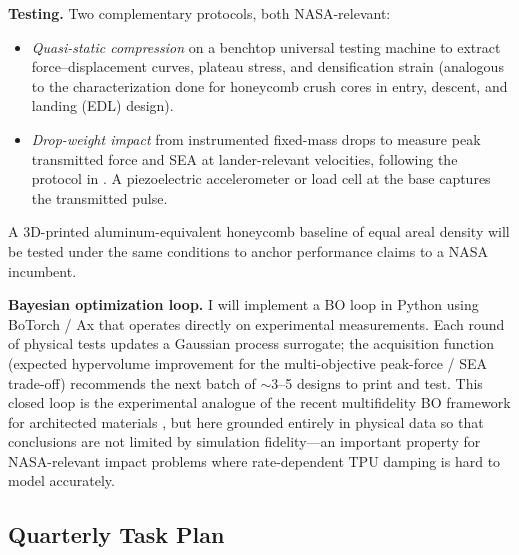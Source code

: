 \documentclass[11pt]{article}
\begin{document}
\textbf{Testing.} Two complementary protocols, both NASA-relevant:
\begin{itemize}[leftmargin=1.5em,itemsep=0.1em]
    \item \emph{Quasi-static compression} on a benchtop universal testing
    machine to extract force--displacement curves, plateau stress, and
    densification strain (analogous to the characterization done for
    honeycomb crush cores in entry, descent, and landing (EDL) design).
    \item \emph{Drop-weight impact} from instrumented fixed-mass drops to
    measure peak transmitted force and SEA at lander-relevant velocities,
    following the protocol in \citep{pajunen2019design}.
    A piezoelectric accelerometer or load cell at the base captures the
    transmitted pulse.
\end{itemize}
A 3D-printed aluminum-equivalent honeycomb baseline of equal areal density
will be tested under the same conditions to anchor performance claims to a
NASA incumbent.

\textbf{Bayesian optimization loop.} I will implement a BO loop in Python
using BoTorch / Ax \citep{balandat2020botorch} that operates directly on
experimental measurements.  Each round of physical tests updates a Gaussian
process surrogate; the acquisition function (expected hypervolume improvement
for the multi-objective peak-force / SEA trade-off) recommends the next batch
of $\sim$3--5 designs to print and test.  This closed loop is the experimental
analogue of the recent multifidelity BO framework for architected
materials \citep{mo2023accelerated}, but here grounded entirely in physical
data so that conclusions are not
limited by simulation fidelity---an important property for NASA-relevant
impact problems where rate-dependent TPU damping is hard to model accurately.

\subsection*{Quarterly Task Plan}
\end{document}
